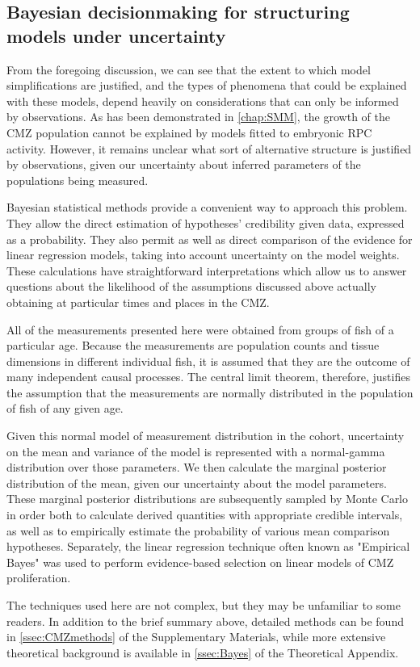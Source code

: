 \subsection{Bayesian decisionmaking for structuring models under uncertainty}
From the foregoing discussion, we can see that the extent to which model simplifications are justified, and the types of phenomena that could be explained with these models, depend heavily on considerations that can only be informed by observations. As has been demonstrated in \autoref{chap:SMM}, the growth of the CMZ population cannot be explained by models fitted to embryonic RPC activity. However, it remains unclear what sort of alternative structure is justified by observations, given our uncertainty about inferred parameters of the populations being measured.

Bayesian statistical methods provide a convenient way to approach this problem. They allow the direct estimation of hypotheses' credibility given data, expressed as a probability. They also permit as well as direct comparison of the evidence for linear regression models, taking into account uncertainty on the model weights. These calculations have straightforward interpretations which allow us to answer questions about the likelihood of the assumptions discussed above actually obtaining at particular times and places in the CMZ.

All of the measurements presented here were obtained from groups of fish of a particular age. Because the measurements are population counts and tissue dimensions in different individual fish, it is assumed that they are the outcome of many independent causal processes. The central limit theorem, therefore, justifies the assumption that the measurements are normally distributed in the population of fish of any given age.

Given this normal model of measurement distribution in the cohort, uncertainty on the mean and variance of the model is represented with a normal-gamma distribution over those parameters. We then calculate the marginal posterior distribution of the mean, given our uncertainty about the model parameters. These marginal posterior distributions are subsequently sampled by Monte Carlo in order both to calculate derived quantities with appropriate credible intervals, as well as to empirically estimate the probability of various mean comparison hypotheses. Separately, the linear regression technique often known as "Empirical Bayes" was used to perform evidence-based selection on linear models of CMZ proliferation.

The techniques used here are not complex, but they may be unfamiliar to some readers. In addition to the brief summary above, detailed methods can be found in \autoref{ssec:CMZmethods} of the Supplementary Materials, while more extensive theoretical background is available in \autoref{ssec:Bayes} of the Theoretical Appendix. 